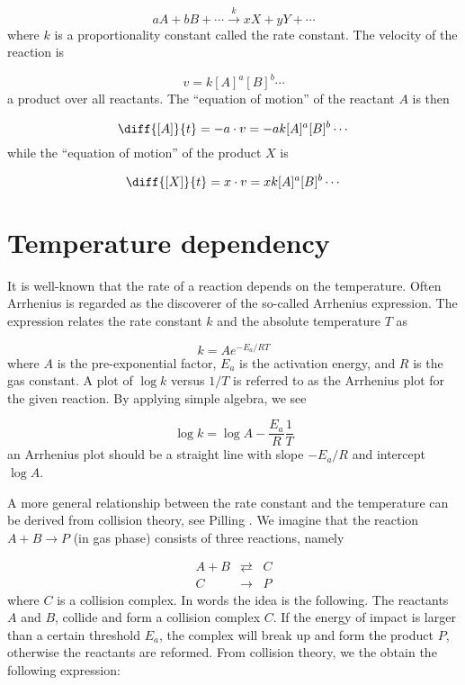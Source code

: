 \begin{equation}
  a A + b B + \cdots \overset{k}{\rightarrow} x X + y Y + \cdots
\end{equation}
where $k$ is a proportionality constant called the rate constant. The
velocity of the reaction is 

\begin{equation}
  v = k [A]^a[B]^b \cdots
\end{equation}
\ie a product over all reactants. The ``equation of motion'' of the
reactant $A$ is then

\begin{equation}
  \diff{[A]}{t} = -a\cdot v = -a k[A]^a [B]^b \cdots
\end{equation}
while the ``equation of motion'' of the product $X$ is

\begin{equation}
  \diff{[X]}{t} = x\cdot v = x k[A]^a [B]^b \cdots
\end{equation}


\section{Temperature dependency}
\label{sect:TempDepend}
It is well-known that the rate of a reaction depends on the
temperature. Often Arrhenius is regarded as the discoverer of the
so-called Arrhenius expression. The expression relates the rate
constant $k$ and the absolute temperature $T$ as \cite{Pilling95}

\begin{equation}
\label{eq:Arrhenius}
  k = Ae^{-E_a/RT}
\end{equation}
where $A$ is the pre-exponential factor, $E_a$ is the activation
energy, and $R$ is the gas constant. A plot of $\log k$ versus $1/T$
is referred to as the Arrhenius plot for the given reaction. By
applying simple algebra, we see

\begin{equation}
  \log k = \log A - \frac{E_a}{R} \frac{1}{T}
\end{equation}
\ie an Arrhenius plot should be a straight line with slope
$-E_a/R$ and intercept $\log A$. 

A more general relationship between the rate constant and the
temperature can be derived from collision theory, see \eg Pilling
\etal \cite{Pilling95}. We imagine that the reaction $A+B \rightarrow
P$ (in gas phase) consists of three reactions, namely

\begin{subequations}
  \begin{eqnarray}
    A + B &\rightleftarrows& C \\
    C     &\rightarrow&     P 
  \end{eqnarray}
\end{subequations}
where $C$ is a collision complex. In words the idea is the
following. The reactants $A$ and $B$, collide and form a collision
complex $C$. If the energy of impact is larger than a certain
threshold $E_a$, the complex will break up and form the product
$P$, otherwise the reactants are reformed. From collision theory, we
the obtain the following expression:

